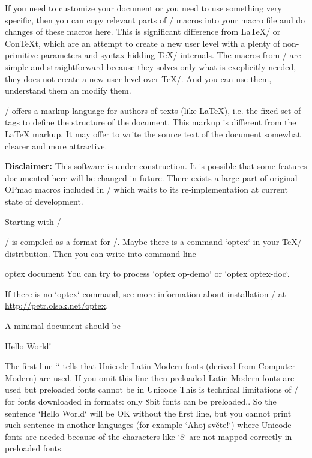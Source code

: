 If you need to customize your document or you need to use something
very specific, then you can copy relevant parts of \OpTeX/ macros into your macro
file and do changes of these macros here. This is significant difference from
\LaTeX/ or ConTeXt, which are an attempt to create a new user level with a
plenty of non-primitive parameters and syntax hidding \TeX/ internals.
The macros from \OpTeX/ are simple and straightforward because they solves only
what is excplicitly needed, they does not create a new user level over \TeX/.
And you can use them, understand them an modify them.

\OpTeX/ offers a markup language for authors of texts (like \LaTeX),
i.e. the fixed set of tags to define the structure of the document. This
markup is different from the \LaTeX{} markup. It may offer to write the
source text of the document somewhat clearer and more attractive. 

\new 
{\bf Disclaimer:} This software is under construction. It is possible
that some features documented here will be changed in future. There exists a
large part of original OPmac macros included in \OpTeX/ which waits to its
re-implementation at current state of development.


\sec Starting with \OpTeX/

\new
\OpTeX/ is compiled as a format for \LuaTeX/. Maybe there is a command
`optex` in your \TeX/ distribution. Then you can write into command line

\begtt
optex document
\endtt
%
You can try to process `optex op-demo` or `optex optex-doc`.

If there is no `optex` command, see more information about installation
\OpTeX/ at \url{http://petr.olsak.net/optex}. 

A minimal document should be

\begtt
\fontfam[LMfonts]
Hello World! \bye
\endtt

The first line `\fontfam[LMfonts]` tells that Unicode Latin Modern 
fonts (derived from Computer Modern) are used. If you omit this line then
preloaded Latin Modern fonts are used but preloaded fonts cannot be in
Unicode\fnote
{This is technical limitations of \LuaTeX/ for fonts downloaded in formats:
only 8bit fonts can be preloaded.}.
So the sentence `Hello World` will be OK without the first line, but you 
cannot print such sentence in another languages (for example `Ahoj světe!`) 
where Unicode fonts are needed
because of the characters like `ě` are not mapped correctly in preloaded
fonts.

